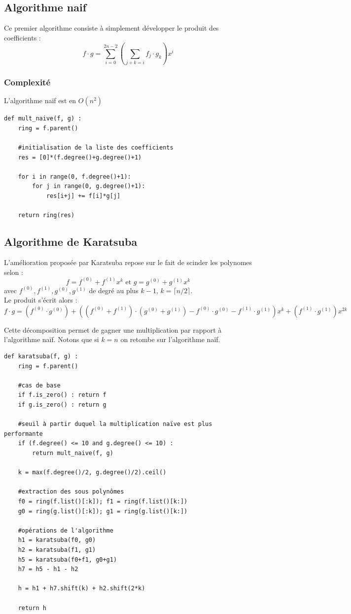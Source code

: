 \documentclass[a4paper]{article}
\begin{document}
\subsection{Algorithme naif}

Ce premier algorithme consiste à simplement développer le produit des coefficients :
\[
f\cdot g=\sum_{i=0}^{2n-2} (\sum_{j+k=i}f_j\cdot g_k) x^i
\]

\subsubsection*{Complexité}
L'algorithme naïf est en $O(n^2)$

\begin{lstlisting}[title={multiplication naive}]
    def mult_naive(f, g) :
    ring = f.parent()

    #initialisation de la liste des coefficients
    res = [0]*(f.degree()+g.degree()+1) 
    
    for i in range(0, f.degree()+1):
        for j in range(0, g.degree()+1):
            res[i+j] += f[i]*g[j]

    return ring(res) 
\end{lstlisting}


\subsection{Algorithme de Karatsuba}

L'amélioration proposée par Karatsuba repose sur le fait de scinder les polynomes selon :
\[
f=f^{(0)}+f^{(1)}x^k\text{ et }g = g^{(0)}+g^{(1)}x^k
\]
avec $f^{(0)}, f^{(1)}, g^{(0)}, g^{(1)}$ de degré au plus $k-1$, $k=\lceil n/2 \rceil$. \\
Le produit s'écrit alors :
\[
  f\cdot g = (f^{(0)}\cdot g^{(0)})
  +\left((f^{(0)}+f^{(1)})\cdot (g^{(0)} + g^{(1)}) - f^{(0)}\cdot g^{(0)} - f^{(1)}\cdot g^{(1)}\right)x^k+
  (f^{(1)}\cdot g^{(1)})x^{2k} 
\]

Cette décomposition permet de gagner une multiplication par rapport à l'algorithme naïf. Notons que si $k=n$ on retombe sur l'algorithme naïf.

\begin{lstlisting}[title={Karatsuba}]
def karatsuba(f, g) :
    ring = f.parent()

    #cas de base
    if f.is_zero() : return f
    if g.is_zero() : return g
    
    #seuil à partir duquel la multiplication naïve est plus performante
    if (f.degree() <= 10 and g.degree() <= 10) : 
        return mult_naive(f, g)

    k = max(f.degree()/2, g.degree()/2).ceil()

    #extraction des sous polynômes
    f0 = ring(f.list()[:k]); f1 = ring(f.list()[k:])
    g0 = ring(g.list()[:k]); g1 = ring(g.list()[k:])

    #opérations de l'algorithme
    h1 = karatsuba(f0, g0)
    h2 = karatsuba(f1, g1)
    h5 = karatsuba(f0+f1, g0+g1)
    h7 = h5 - h1 - h2

    h = h1 + h7.shift(k) + h2.shift(2*k)

    return h
\end{lstlisting}
\end{document}

